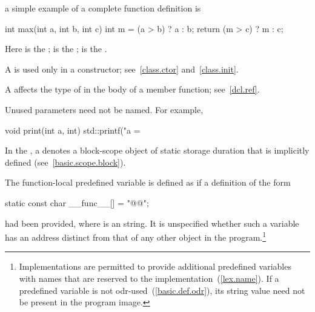 \pnum
\begin{example}
a simple example of a complete function definition is

%
\begin{codeblock}
int max(int a, int b, int c) {
  int m = (a > b) ? a : b;
  return (m > c) ? m : c;
}
\end{codeblock}

Here
is the
;
is the
;
is the
.
\end{example}

\pnum
{}%
%
%
A
is used only in a constructor; see~\ref{class.ctor} and~\ref{class.init}.

\pnum
\begin{note}
A  affects the type of 
in the body of a member function; see~\ref{dcl.ref}.
\end{note}

\pnum
\begin{note}
Unused parameters need not be named.
For example,

%
\begin{codeblock}
void print(int a, int) {
  std::printf("a = %
}
\end{codeblock}
\end{note}

\pnum
In the , a
 denotes a block-scope object of static
storage duration that is implicitly defined (see~\ref{basic.scope.block}).

\pnum
The function-local predefined variable  is
defined as if a definition of the form

\begin{codeblock}
static const char __func__[] = "@@";
\end{codeblock}

had been provided, where  is an  string. It is unspecified whether such a variable has an address
distinct from that of any other object in the program.\footnote{Implementations are
permitted to provide additional predefined variables with names that are reserved to the
implementation~(\ref{lex.name}). If a predefined variable is not
odr-used~(\ref{basic.def.odr}), its string value need not be present in the program image.}

